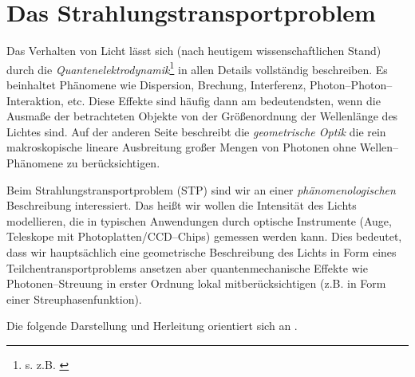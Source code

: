 	\chapter{Das Strahlungstransportproblem}
	\label{sec:radiative_transfer}
	
	Das Verhalten von Licht lässt sich (nach heutigem wissenschaftlichen Stand) durch die {\em Quantenelektrodynamik}\footnote{s. z.B. \citet{Feynman:1990p11684}} in allen Details vollständig beschreiben. Es beinhaltet Phänomene wie Dispersion, Brechung, Interferenz, Photon--Photon--Interaktion, etc. Diese Effekte sind häufig dann am bedeutendsten, wenn die Ausmaße der betrachteten Objekte von der Größenordnung der Wellenlänge des Lichtes sind. Auf der anderen Seite beschreibt die {\em geometrische Optik} die rein makroskopische lineare Ausbreitung großer Mengen von Photonen ohne Wellen--Phänomene zu berücksichtigen.
	
	Beim Strahlungstransportproblem (STP) sind wir an einer {\em phänomenologischen} Beschreibung interessiert. Das heißt wir wollen die Intensität des Lichts modellieren, die in typischen Anwendungen durch optische Instrumente (Auge, Teleskope mit Photoplatten/CCD--Chips) gemessen werden kann. Dies bedeutet, dass wir hauptsächlich eine geometrische Beschreibung des Lichts in Form eines Teilchentransportproblems ansetzen aber quantenmechanische Effekte wie Photonen--Streuung in erster Ordnung lokal mitberücksichtigen (z.B. in Form einer Streuphasenfunktion).
	
	Die folgende Darstellung und Herleitung orientiert sich an \citep{Arvo:1993p9035}.
	
